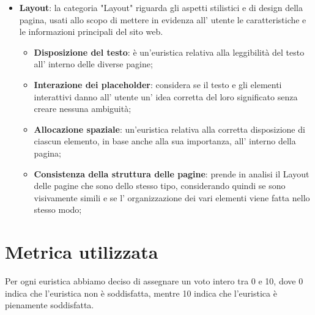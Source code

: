 \begin{itemize}
\begin{itemize}
            \end{itemize}
            \item \textbf{Layout}: la categoria "Layout" riguarda gli aspetti
            stilistici e di design della pagina, usati allo scopo di mettere in
            evidenza all' utente le caratteristiche e le informazioni principali
            del sito web.
            \begin{itemize}
                \item \textbf{Disposizione del testo}: è un'euristica relativa
                alla leggibilità del testo all' interno delle diverse pagine;
                \item \textbf{Interazione dei placeholder}:  considera se il
                testo e gli elementi interattivi danno all' utente un' idea
                corretta del loro significato senza creare nessuna ambiguità;
                \item \textbf{Allocazione spaziale}: un'euristica relativa alla
                corretta disposizione di ciascun elemento, in base anche alla
                sua importanza, all' interno della pagina;
                \item \textbf{Consistenza della struttura delle pagine}: prende
                in analisi il Layout delle pagine che sono dello stesso tipo,
                considerando quindi se sono visivamente simili e se l'
                organizzazione dei vari elementi viene fatta nello stesso modo;
            \end{itemize}
        \end{itemize}
    \section{Metrica utilizzata} 
    Per ogni euristica abbiamo deciso di assegnare un voto intero tra 0 e 10,
    dove 0 indica che l'euristica non è soddisfatta, mentre 10 indica che
    l'euristica è pienamente soddisfatta.